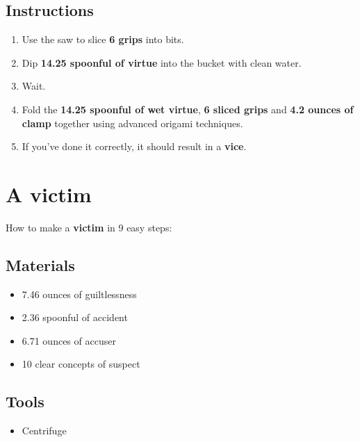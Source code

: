 \documentclass{article}
\begin{document}
\subsection{Instructions}\begin{enumerate}
\item 
Use the saw to slice \textbf{6 grips} into bits.
\item 
Dip \textbf{14.25 spoonful of virtue} into the bucket with clean water.
\item 
Wait.
\item 
Fold the \textbf{14.25 spoonful of wet virtue}, \textbf{6 sliced grips} and \textbf{4.2 ounces of clamp} together using advanced origami techniques.
\item 
If you've done it correctly, it should result in a \textbf{vice}.
\end{enumerate}
\newpage
\section{A victim}How to make a \textbf{victim} in 9 easy steps:

\subsection{Materials}\begin{itemize}
\item 
7.46 ounces of guiltlessness
\item 
2.36 spoonful of accident
\item 
6.71 ounces of accuser
\item 
10 clear concepts of suspect
\end{itemize}
\subsection{Tools}\begin{itemize}
\item 
Centrifuge
\end{itemize}
\end{document}
